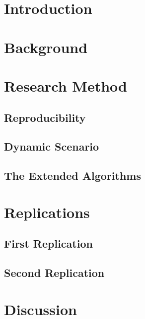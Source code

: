 \documentclass[review]{elsarticle}
\begin{document}

\section{Introduction} \label{sec:introduction}


\section{Background}\label{sec:background}


\section{Research Method}\label{sec:method}


\subsection{Reproducibility}\label{sec:reproducibility}


\subsection{Dynamic Scenario}\label{sec:dynamic_scenario}


\subsection{The Extended Algorithms}\label{sec:changes}


\section{Replications}\label{sec:replications}


\subsection{First Replication}\label{sec:original}


\subsection{Second Replication}\label{sec:replication}


\section{Discussion}\label{sec:discussion}

\end{document}
